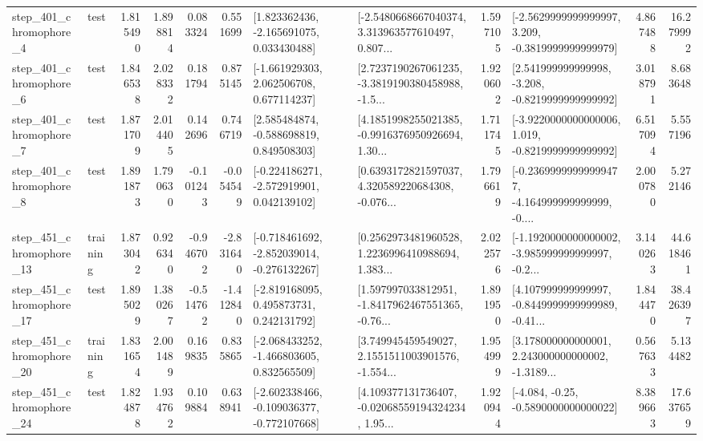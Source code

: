 \begin{tabular}{llrrrrllrlrr}
   step\_401\_chromophore\_4 &      test &      1.815490 &    1.898814 &      0.083324 &  0.551699 &    [1.823362436, -2.165691075, 0.033430488] &  [-2.5480668667040374, 3.313963577610497, 0.807... &       1.597105 &  [-2.5629999999999997, 3.209, -0.3819999999999979] &            4.867488 &         16.279992 \\
   step\_401\_chromophore\_6 &      test &      1.846538 &    2.028332 &      0.181794 &  0.875145 &    [-1.661929303, 2.062506708, 0.677114237] &  [2.7237190267061235, -3.3819190380458988, -1.5... &       1.920602 &   [2.541999999999998, -3.208, -0.8219999999999992] &            3.018791 &          8.683648 \\
   step\_401\_chromophore\_7 &      test &      1.871709 &    2.014405 &      0.142696 &  0.746719 &    [2.585484874, -0.588698819, 0.849508303] &  [4.1851998255021385, -0.9916376950926694, 1.30... &       1.711745 &  [-3.9220000000000006, 1.019, -0.8219999999999992] &            6.517094 &          5.557196 \\
   step\_401\_chromophore\_8 &      test &      1.891873 &    1.790630 &     -0.101243 & -0.054549 &   [-0.224186271, -2.572919901, 0.042139102] &  [0.6393172821597037, 4.320589220684308, -0.076... &       1.796619 &  [-0.23699999999999477, -4.164999999999999, -0.... &            2.000780 &          5.272146 \\
  step\_451\_chromophore\_13 &  training &      1.873042 &    0.926340 &     -0.946702 & -2.831640 &  [-0.718461692, -2.852039014, -0.276132267] &  [0.2562973481960528, 1.2236996410988694, 1.383... &       2.022576 &  [-1.1920000000000002, -3.985999999999997, -0.2... &            3.140263 &         44.618461 \\
  step\_451\_chromophore\_17 &      test &      1.895029 &    1.380267 &     -0.514762 & -1.412840 &    [-2.819168095, 0.495873731, 0.242131792] &  [1.597997033812951, -1.8417962467551365, -0.76... &       1.891950 &  [4.107999999999997, -0.8449999999999989, -0.41... &            1.844470 &         38.426397 \\
  step\_451\_chromophore\_20 &  training &      1.831654 &    2.001489 &      0.169835 &  0.835865 &   [-2.068433252, -1.466803605, 0.832565509] &  [3.749945459549027, 2.1551511003901576, -1.554... &       1.954999 &  [3.178000000000001, 2.243000000000002, -1.3189... &            0.567633 &          5.134482 \\
  step\_451\_chromophore\_24 &      test &      1.824878 &    1.934762 &      0.109884 &  0.638941 &  [-2.602338466, -0.109036377, -0.772107668] &  [4.109377131736407, -0.02068559194324234, 1.95... &       1.920944 &               [-4.084, -0.25, -0.5890000000000022] &            8.389663 &         17.637659 \\

\end{tabular}
